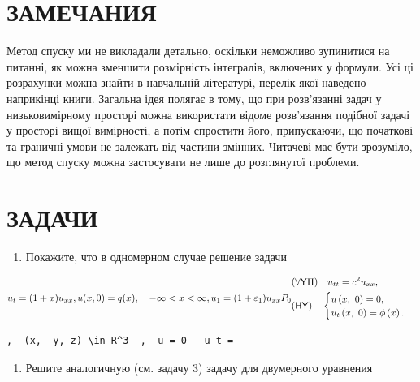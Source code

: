 \documentclass[
  ukrainian,
]{article}
\providecommand{\tightlist}{%
  \setlength{\itemsep}{0pt}\setlength{\parskip}{0pt}}
\begin{document}
\section{ЗАМЕЧАНИЯ}\label{ux437ux430ux43cux435ux447ux430ux43dux438ux44f-1}

Метод спуску ми не викладали детально, оскільки неможливо зупинитися на
питанні, як можна зменшити розмірність інтегралів, включених у формули.
Усі ці розрахунки можна знайти в навчальній літературі, перелік якої
наведено наприкінці книги. Загальна ідея полягає в тому, що при
розв'язанні задач у низьковимірному просторі можна використати відоме
розв'язання подібної задачі у просторі вищої вимірності, а потім
спростити його, припускаючи, що початкові та граничні умови не залежать
від частини змінних. Читачеві має бути зрозуміло, що метод спуску можна
застосувати не лише до розглянутої проблеми.

\section{ЗАДАЧИ}\label{ux437ux430ux434ux430ux447ux438-2}

\begin{enumerate}
\def\labelenumi{\arabic{enumi}.}
\tightlist
\item
  Покажите, что в одномерном случае решение задачи
\end{enumerate}

\[
u_t = (1+x) u_{xx}, \\ u(x, 0) = q(x), \quad -\infty < x < \infty,
u_1 = (1 + \varepsilon_1) u_{xx}
P_{0}
\begin{aligned} & (\forall \mathsf{Y}\Pi) \quad u_{tt} = c^2 u_{xx}, \\ & (\mathsf{H} \mathsf{Y}) \quad \begin{cases} u\left(x, \ 0\right) = 0, \\ u_t\left(x, \ 0\right) = \phi\left(x\right). \end{cases} \end{aligned}
\]

\begin{verbatim}
,  (x,  y, z) \in R^3  ,  u = 0   u_t =
\end{verbatim}

\begin{enumerate}
\def\labelenumi{\arabic{enumi}.}
\setcounter{enumi}{3}
\tightlist
\item
  Решите аналогичную (см. задачу 3) задачу для двумерного уравнения
\end{enumerate}
\end{document}

